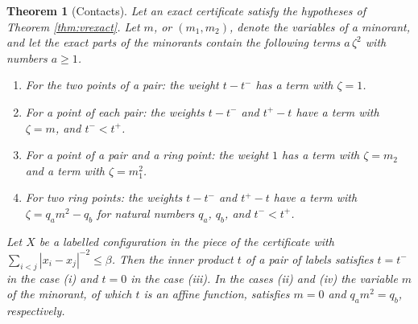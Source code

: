 \documentclass[reqno,a4paper,11pt]{amsart}
\numberwithin{equation}{section}
\newtheorem{theorem}{Theorem}[section]
\begin{document}
\begin{theorem}[Contacts]\label{thm:contacts}
Let an exact certificate satisfy the hypotheses of Theorem \ref{thm:vrexact}. Let $m$, or $(m_1, m_2)$, denote the variables of a minorant, and let the exact parts of the minorants contain the following terms $a \, \zeta^2$ with numbers $a \geq 1$.
\begin{enumerate}
    \item[(i)] For the two points of a pair: the weight $t - t^-$ has a term with $\zeta = 1$.
    \item[(ii)] For a point of each pair: the weights $t - t^-$ and $t^+ - t$ have a term with $\zeta = m$, and $t^- < t^+$.
    \item[(iii)] For a point of a pair and a ring point: the weight $1$ has a term with $\zeta = m_2$ and a term with $\zeta = m_1^2$.
    \item[(iv)] For two ring points: the weights $t - t^-$ and $t^+ - t$ have a term with $\zeta = q_a m^2 - q_b$ for natural numbers $q_a$, $q_b$, and $t^- < t^+$.
\end{enumerate}
Let $X$ be a labelled configuration in the piece of the certificate with $\sum_{i<j} |x_i - x_j|^{-2} \leq \beta$. Then the inner product $t$ of a pair of labels satisfies $t = t^-$ in the case \textup{(i)} and $t = 0$ in the case \textup{(iii)}. In the cases \textup{(ii)} and \textup{(iv)} the variable $m$ of the minorant, of which $t$ is an affine function, satisfies $m = 0$ and $q_a m^2 = q_b$, respectively.
\end{theorem}
\end{document}
